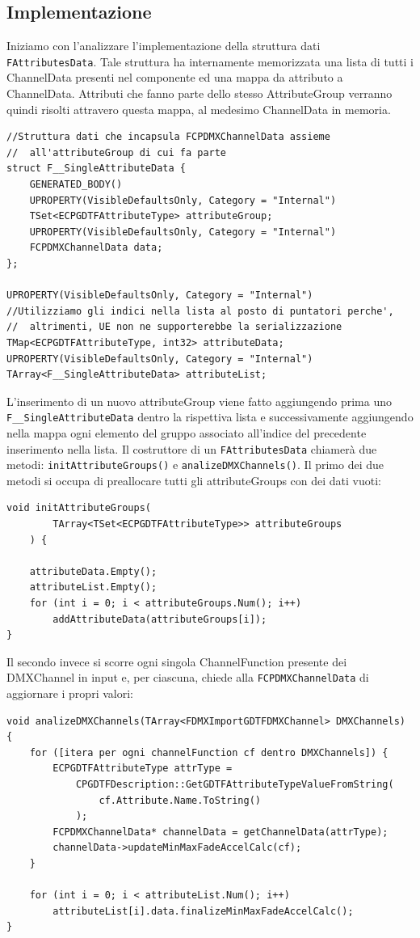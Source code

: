 \documentclass[main.tex]{subfiles}
\begin{document}
\subsection{Implementazione}\label{subsec:3_implementation}
Iniziamo con l'analizzare l'implementazione della struttura dati \lstinline{FAttributesData}. Tale struttura ha internamente memorizzata una lista di tutti i ChannelData presenti nel componente ed una mappa da attributo a ChannelData. Attributi che fanno parte dello stesso AttributeGroup verranno quindi risolti attravero questa mappa, al medesimo ChannelData in memoria.
\lstset{language=UEcpp}
\begin{lstlisting}
//Struttura dati che incapsula FCPDMXChannelData assieme
//  all'attributeGroup di cui fa parte
struct F__SingleAttributeData {
    GENERATED_BODY()
    UPROPERTY(VisibleDefaultsOnly, Category = "Internal")
    TSet<ECPGDTFAttributeType> attributeGroup;
    UPROPERTY(VisibleDefaultsOnly, Category = "Internal")
    FCPDMXChannelData data;
};

UPROPERTY(VisibleDefaultsOnly, Category = "Internal")
//Utilizziamo gli indici nella lista al posto di puntatori perche',
//  altrimenti, UE non ne supporterebbe la serializzazione
TMap<ECPGDTFAttributeType, int32> attributeData;
UPROPERTY(VisibleDefaultsOnly, Category = "Internal")
TArray<F__SingleAttributeData> attributeList;
\end{lstlisting}
L'inserimento di un nuovo attributeGroup viene fatto aggiungendo prima uno \lstinline{F__SingleAttributeData} dentro la rispettiva lista e successivamente aggiungendo nella mappa ogni elemento del gruppo associato all'indice del precedente inserimento nella lista.\newline
Il costruttore di un \lstinline{FAttributesData} chiamerà due metodi: \lstinline{initAttributeGroups()} e \lstinline{analizeDMXChannels()}. Il primo dei due metodi si occupa di preallocare tutti gli attributeGroups con dei dati vuoti:
\begin{lstlisting}
void initAttributeGroups(
        TArray<TSet<ECPGDTFAttributeType>> attributeGroups
    ) {

    attributeData.Empty();
    attributeList.Empty();
    for (int i = 0; i < attributeGroups.Num(); i++)
        addAttributeData(attributeGroups[i]);
}
\end{lstlisting}
Il secondo invece si scorre ogni singola ChannelFunction presente dei DMXChannel in input e, per ciascuna, chiede alla \lstinline{FCPDMXChannelData} di aggiornare i propri valori:
\begin{lstlisting}
void analizeDMXChannels(TArray<FDMXImportGDTFDMXChannel> DMXChannels) {
    for ([itera per ogni channelFunction cf dentro DMXChannels]) {
        ECPGDTFAttributeType attrType =
            CPGDTFDescription::GetGDTFAttributeTypeValueFromString(
                cf.Attribute.Name.ToString()
            );
        FCPDMXChannelData* channelData = getChannelData(attrType);
        channelData->updateMinMaxFadeAccelCalc(cf);
    }

    for (int i = 0; i < attributeList.Num(); i++)
        attributeList[i].data.finalizeMinMaxFadeAccelCalc();
}
\end{lstlisting}
\end{document}
